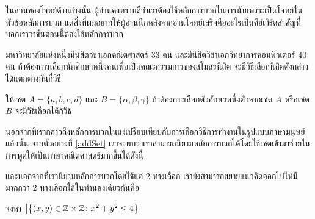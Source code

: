 ในส่วนของโจทย์ด้านล่างนั้น ผู้อ่านคงทราบดีว่าเราต้องใช้หลักการบวกในการนับเพราะเป็นโจทย์ในหัวข้อหลักการบวก แต่สิ่งที่ผมอยากให้ผู้อ่านนึกหลังจากอ่านโจทย์เสร็จคืออะไรเป็นคีย์เวิร์ดสำคัญที่บอกเราว่าขั้นตอนนี้ต้องใช้หลักการบวก

\begin{exam}
	มหาวิทยาลัยแห่งหนึ่งมีนิสิตวิชาเอกคณิตศาสตร์ 33 คน และมีนิสิตวิชาเอกวิทยาการคอมพิวเตอร์ 40 คน ถ้าต้องการเลือกนักศึกษาหนึ่งคนเพื่อเป็นคณะกรรมการของสโมสรนิสิต จะมีวิธีเลือกนิสิตดังกล่าวได้แตกต่างกันกี่วิธี
\end{exam}


\begin{exam} \label{addSet}
	ให้เซต $ A=\{a,b,c,d\} $ และ $ B=\{\alpha,\beta,\gamma\} $ ถ้าต้องการเลือกตัวอักษรหนึ่งตัวจากเซต $ A $ หรือเซต $ B $ จะมีวิธีเลือกได้กี่วิธี
\end{exam}

นอกจากที่เรากล่าวถึงหลักการบวกในแง่เปรียบเทียบกับการเลือกวิธีการทำงานในรูปแบบภาษามนุษย์แล้วนั้น จากตัวอย่างที่ \ref{addSet} เราจะพบว่าเราสามารถนิยามหลักการบวกได้โดยใช้เซตเข้ามาช่วยในการพูดให้เป็นภาษาคณิตศาสตร์มากขึ้นได้ดังนี้\\


และนอกจากที่เรานิยามหลักการบวกโดยใช้แค่ 2 ทางเลือก เรายังสามารถขยายแนวคิดออกไปให้มีมากกว่า 2 ทางเลือกได้ในทำนองเดียวกันคือ\\


\begin{exam}
	จงหา $ \left| \left\{ (x,y) \in \mathbb{Z}\times\mathbb{Z} \colon x^2+y^2\leq 4 \right\} \right| $
\end{exam}
